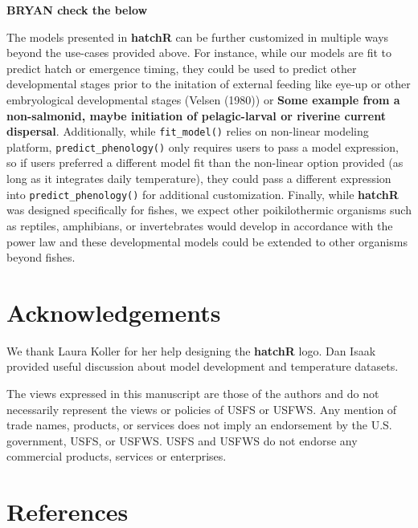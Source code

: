 \documentclass[10pt,a4paper,onecolumn]{article}
\begin{document}
\textbf{BRYAN check the below}

The models presented in \textbf{hatchR} can be further customized in
multiple ways beyond the use-cases provided above. For instance, while
our models are fit to predict hatch or emergence timing, they could be
used to predict other developmental stages prior to the initation of
external feeding like eye-up or other embryological developmental stages
(Velsen (1980)) or \textbf{Some example from a non-salmonid, maybe
initiation of pelagic-larval or riverine current dispersal}.
Additionally, while \texttt{fit\_model()} relies on non-linear modeling
platform, \texttt{predict\_phenology()} only requires users to pass a
model expression, so if users preferred a different model fit than the
non-linear option provided (as long as it integrates daily temperature),
they could pass a different expression into
\texttt{predict\_phenology()} for additional customization. Finally,
while \textbf{hatchR} was designed specifically for fishes, we expect
other poikilothermic organisms such as reptiles, amphibians, or
invertebrates would develop in accordance with the power law and these
developmental models could be extended to other organisms beyond fishes.

\section{Acknowledgements}\label{acknowledgements}

We thank Laura Koller for her help designing the \textbf{hatchR} logo.
Dan Isaak provided useful discussion about model development and
temperature datasets.

The views expressed in this manuscript are those of the authors and do
not necessarily represent the views or policies of USFS or USFWS. Any
mention of trade names, products, or services does not imply an
endorsement by the U.S. government, USFS, or USFWS. USFS and USFWS do
not endorse any commercial products, services or enterprises.

\section*{References}\label{references}
\end{document}
